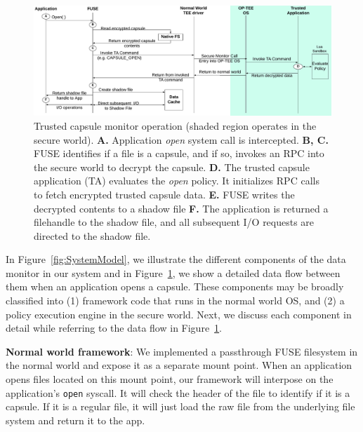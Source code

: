 \begin{figure}
 \centering
  \includegraphics[width=\textwidth]{fig/TC_open_operation.pdf}
  \caption{Trusted capsule monitor operation (shaded region operates in the secure world).
  		   \textbf{A.} Application \textit{open} system call is intercepted.
  		   \textbf{B, C.} FUSE identifies if a file is a capsule, and if so, invokes an RPC into the secure world to decrypt the capsule.
           \textbf{D.} The trusted capsule application (TA) evaluates the \textit{open} policy. %
                           It initializes RPC calls to fetch encrypted trusted capsule data.
           \textbf{E.} FUSE writes the decrypted contents to a shadow file
           \textbf{F.} The application is returned a filehandle to the shadow file, and all subsequent I/O requests are directed to the shadow file.
           }
  \label{fig:FlowChart}
\end{figure}

In Figure~\ref{fig:SystemModel}, we illustrate the different components of the
data monitor in our system and in Figure~\ref{fig:FlowChart}, we show a detailed
data flow between them when an application opens a capsule. These components may
be broadly classified into (1) framework code that runs in the normal world OS,
and (2) a policy execution engine in the secure world. Next, we discuss
each component in detail while referring to the data flow in
Figure~\ref{fig:FlowChart}.

{\bf Normal world framework}: We implemented a passthrough FUSE filesystem in
the normal world and expose it as a separate mount point. When an application
opens files located on this mount point, our framework will interpose on the
application's {\tt open} syscall. It will check the header of the file to
identify if it is a capsule. If it is a regular file, it will just load the raw
file from the underlying file system and return it to the app.

